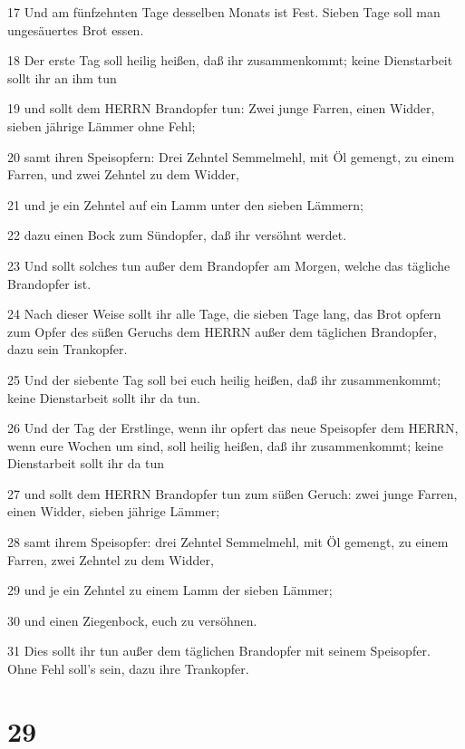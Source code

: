 \par 17 Und am fünfzehnten Tage desselben Monats ist Fest. Sieben Tage soll man ungesäuertes Brot essen.
\par 18 Der erste Tag soll heilig heißen, daß ihr zusammenkommt; keine Dienstarbeit sollt ihr an ihm tun
\par 19 und sollt dem HERRN Brandopfer tun: Zwei junge Farren, einen Widder, sieben jährige Lämmer ohne Fehl;
\par 20 samt ihren Speisopfern: Drei Zehntel Semmelmehl, mit Öl gemengt, zu einem Farren, und zwei Zehntel zu dem Widder,
\par 21 und je ein Zehntel auf ein Lamm unter den sieben Lämmern;
\par 22 dazu einen Bock zum Sündopfer, daß ihr versöhnt werdet.
\par 23 Und sollt solches tun außer dem Brandopfer am Morgen, welche das tägliche Brandopfer ist.
\par 24 Nach dieser Weise sollt ihr alle Tage, die sieben Tage lang, das Brot opfern zum Opfer des süßen Geruchs dem HERRN außer dem täglichen Brandopfer, dazu sein Trankopfer.
\par 25 Und der siebente Tag soll bei euch heilig heißen, daß ihr zusammenkommt; keine Dienstarbeit sollt ihr da tun.
\par 26 Und der Tag der Erstlinge, wenn ihr opfert das neue Speisopfer dem HERRN, wenn eure Wochen um sind, soll heilig heißen, daß ihr zusammenkommt; keine Dienstarbeit sollt ihr da tun
\par 27 und sollt dem HERRN Brandopfer tun zum süßen Geruch: zwei junge Farren, einen Widder, sieben jährige Lämmer;
\par 28 samt ihrem Speisopfer: drei Zehntel Semmelmehl, mit Öl gemengt, zu einem Farren, zwei Zehntel zu dem Widder,
\par 29 und je ein Zehntel zu einem Lamm der sieben Lämmer;
\par 30 und einen Ziegenbock, euch zu versöhnen.
\par 31 Dies sollt ihr tun außer dem täglichen Brandopfer mit seinem Speisopfer. Ohne Fehl soll's sein, dazu ihre Trankopfer.

\chapter{29}

